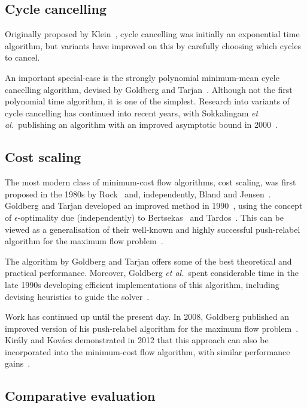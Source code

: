 \subsection{Cycle cancelling}

Originally proposed by Klein~\cite{Klein:1967}, cycle cancelling was initially an exponential time algorithm, but variants have improved on this by carefully choosing which cycles to cancel.

An important special-case is the strongly polynomial minimum-mean cycle cancelling algorithm, devised by Goldberg and Tarjan~\cite{Goldberg:1989}. Although not the first polynomial time algorithm, it is one of the simplest. Research into variants of cycle cancelling has continued into recent years, with Sokkalingam \textit{et al.}\ publishing an algorithm with an improved asymptotic bound in 2000~\cite{Sokkalingam:2000}.

\subsection{Cost scaling} \label{sec:intro-related-work-cs}

The most modern class of minimum-cost flow algorithms, cost scaling, was first proposed in the 1980s by Rock~\cite{Rock:1980} and, independently, Bland and Jensen~\cite{Bland:1985}. Goldberg and Tarjan developed an improved method in 1990~\cite{Goldberg:1990}, using the concept of $\epsilon$-optimality due (independently) to Bertsekas~\cite{Bertsekas:1979} and Tardos~\cite{Tardos:1985}. This can be viewed as a generalisation of their well-known and highly successful push-relabel algorithm for the maximum flow problem~\cite{Goldberg:1988}.

The algorithm by Goldberg and Tarjan offers some of the best theoretical and practical performance. Moreover, Goldberg \textit{et al.}\ spent considerable time in the late 1990s developing efficient implementations of this algorithm, including devising heuristics to guide the solver~\cite{Goldberg:1997,Bunnagel:1998}.

Work has continued up until the present day. In 2008, Goldberg published an improved version of his push-relabel algorithm for the maximum flow problem~\cite{Goldberg:2008}. Kir{\'{a}}ly and Kov{\'{a}}cs demonstrated in 2012 that this approach can also be incorporated into the minimum-cost flow algorithm, with similar performance gains~\cite{KiralyKovacs:2012}.

\subsection{Comparative evaluation}

